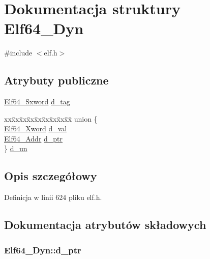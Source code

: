 \hypertarget{struct_elf64___dyn}{\section{Dokumentacja struktury Elf64\-\_\-\-Dyn}
\label{struct_elf64___dyn}
}


{\ttfamily \#include $<$elf.\-h$>$}

\subsection*{Atrybuty publiczne}
\begin{DoxyCompactItemize}
\item 
\hyperlink{elf_8h_a5b450442210b3d21567662fb96ac9a02}{Elf64\-\_\-\-Sxword} \hyperlink{struct_elf64___dyn_a74a63e5acb7d8ddc946a5b0c5eb3c26a}{d\-\_\-tag}
\item 
\begin{tabbing}
xx\=xx\=xx\=xx\=xx\=xx\=xx\=xx\=xx\=\kill
union \{\\
\>\hyperlink{elf_8h_a5447a48a3dae0bd24f606415268c6fe4}{Elf64\_Xword} \hyperlink{struct_elf64___dyn_ab1741378fc34cbcc8caf3f7bb5e6de18}{d\_val}\\
\>\hyperlink{elf_8h_aeed51d08e3a950d637f8ec1f0cd4ef65}{Elf64\_Addr} \hyperlink{struct_elf64___dyn_a4820e579b624438f02827e7b44fbd0f7}{d\_ptr}\\
\} \hyperlink{struct_elf64___dyn_acc39d52f3a8efd552afa2e3369c03215}{d\_un}\\

\end{tabbing}\end{DoxyCompactItemize}


\subsection{Opis szczegółowy}


Definicja w linii 624 pliku elf.\-h.



\subsection{Dokumentacja atrybutów składowych}
\hypertarget{struct_elf64___dyn_a4820e579b624438f02827e7b44fbd0f7}{
\subsubsection[{d\-\_\-ptr}]{ Elf64\-\_\-\-Dyn\-::d\-\_\-ptr}}\label{struct_elf64___dyn_a4820e579b624438f02827e7b44fbd0f7}


